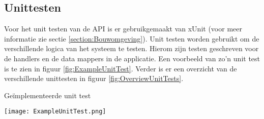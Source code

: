 \subsection{Unittesten}
Voor het unit testen van de API is er gebruikgemaakt van xUnit (voor meer informatie zie sectie \ref{section:Bouwomgeving}).
Unit testen worden gebruikt om de verschillende logica van het systeem te testen.
Hierom zijn testen geschreven voor de handlers en de data mappers in de applicatie.
Een voorbeeld van zo'n unit test is te zien in figuur \ref{fig:ExampleUnitTest}.
Verder is er een overzicht van de verschillende unittesten in figuur \ref{fig:OverviewUnitTests}.

\whitespace[2]
\begin{graphic}
	\captionsetup{type=figure}
	\caption{Geïmplementeerde unit test}
	\texttt{[image: ExampleUnitTest.png]}
	\label{fig:ExampleUnitTest}
\end{graphic}
